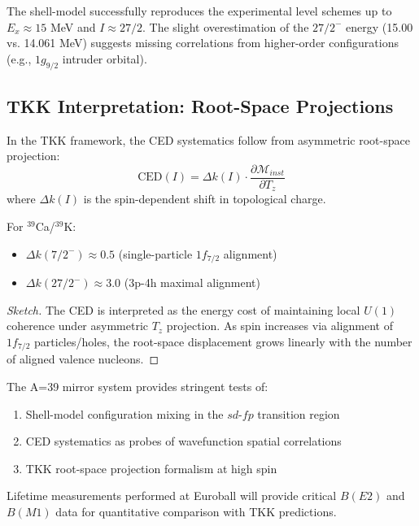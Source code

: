 \begin{remark}
The shell-model successfully reproduces the experimental level schemes up to $E_x \approx 15$ MeV and $I \approx 27/2$. The slight overestimation of the $27/2^-$ energy (15.00 vs. 14.061 MeV) suggests missing correlations from higher-order configurations (e.g., $1g_{9/2}$ intruder orbital).
\end{remark}

\subsection{TKK Interpretation: Root-Space Projections}

\begin{theorem}\label{thm:ced_kahler}
In the TKK framework, the CED systematics follow from asymmetric root-space projection:
\begin{equation}
\text{CED}(I) = \Delta k(I) \cdot \frac{\partial \mathcal{M}_{inst}}{\partial T_z}
\end{equation}
where $\Delta k(I)$ is the spin-dependent shift in topological charge.
\end{theorem}

For $^{39}$Ca/$^{39}$K:
\begin{itemize}
    \item $\Delta k(7/2^-) \approx 0.5$ (single-particle $1f_{7/2}$ alignment)
    \item $\Delta k(27/2^-) \approx 3.0$ (3p-4h maximal alignment)
\end{itemize}

\begin{proof}[Sketch]
The CED is interpreted as the energy cost of maintaining local $U(1)$ coherence under asymmetric $T_z$ projection. As spin increases via alignment of $1f_{7/2}$ particles/holes, the root-space displacement grows linearly with the number of aligned valence nucleons.
\end{proof}

\begin{conclusion}[A=39 as Benchmark]
The A=39 mirror system provides stringent tests of:
\begin{enumerate}
    \item Shell-model configuration mixing in the $sd$-$fp$ transition region
    \item CED systematics as probes of wavefunction spatial correlations
    \item TKK root-space projection formalism at high spin
\end{enumerate}

Lifetime measurements performed at Euroball will provide critical $B(E2)$ and $B(M1)$ data for quantitative comparison with TKK predictions.
\end{conclusion}